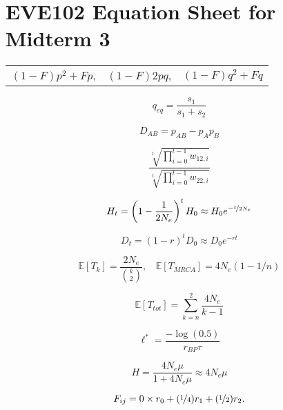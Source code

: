 \documentclass[12pt,twocolumn]{article}
\newcommand{\E}{\mathbb{E}}
\begin{document}
\section*{EVE102 Equation Sheet for Midterm 3}

\begin{center}
\begin{tabular}{ccc}
$(1-F) p^2 + F p$, & $(1-F) 2pq$, & $(1-F) q^2 + F q$ \nonumber
\end{tabular}
\end{center}

\begin{equation}
q_{eq} = \frac{s_1}{s_1+s_2} \nonumber
\end{equation}

\begin{equation}
D_{AB} = p_{AB} - p_Ap_B \nonumber
\end{equation}

\begin{equation}
	\frac{\sqrt[t]{\prod_{i=0}^{t-1}w_{12,i}}}{\sqrt[t]{\prod_{i=0}^{t-1}w_{22,i}}} \nonumber
\end{equation}

\begin{equation}
  H_t = \left(1-\frac{1}{2N_e} \right)^tH_0 \approx H_0 e^{-\nicefrac{t}{2N_e}} \nonumber
\end{equation}

\begin{equation}
  D_t=  (1-r)^t D_0 \approx D_0 e^{-rt} \nonumber
\end{equation}

\begin{equation}
\E[T_k] = \frac{2 N_e}{ {k \choose 2} },~~~~\E[T_{MRCA}] =
4N_e(1-1/n) \nonumber
\end{equation}

\begin{equation}
\E[T_{tot}] = \sum_{k=n}^2 \frac{4N_e}{k-1}  \nonumber
\end{equation}

\begin{equation}
\ell^* = \frac{-\log(0.5)}{r_{BP} \tau }  \nonumber
\end{equation}

\begin{equation}
  H = \frac{4N_e\mu}{1+4N_e\mu} \approx 4N_e\mu  \nonumber
\end{equation}

\begin{equation}
  F_{ij}= 0 \times r_0 + (\nicefrac{1}{4}) r_1  + (\nicefrac{1}{2}) r_2.  \nonumber
\label{eqn:coeffkinship}
\end{equation}
\end{document}
